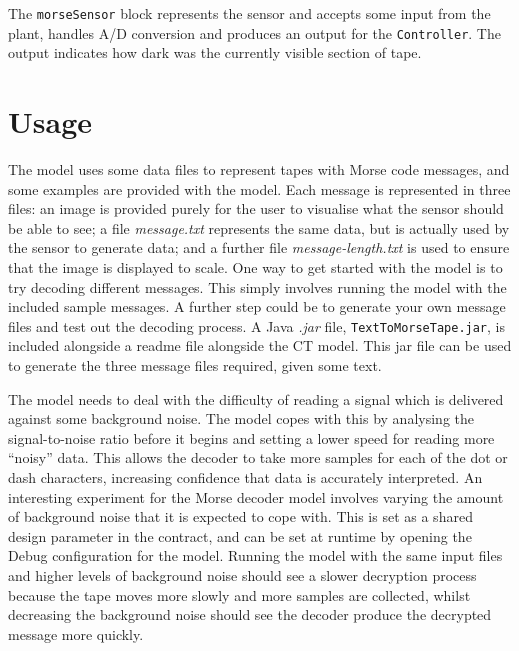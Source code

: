 The \texttt{morseSensor} block represents the sensor and accepts some
input from the plant, handles A/D conversion and produces an output
for the \texttt{Controller}.  The output indicates how dark was the
currently visible section of tape.

\section{Usage} 
The model uses some data files to represent tapes with Morse code
messages, and some examples are provided with the model.  Each message
is represented in three files: an image is provided purely for the
user to visualise what the sensor should be able to see; a file
\emph{message.txt} represents the same data, but is actually used by
the sensor to generate data; and a further file
\emph{message-length.txt} is used to ensure that the image is
displayed to scale.  One way to get started with the model is to try
decoding different messages.  This simply involves running the model
with the included sample messages.  A further step could be to
generate your own message files and test out the decoding process. A
Java \emph{.jar} file, \texttt{TextToMorseTape.jar}, is included
alongside a readme file alongside the CT model.  This jar file can be
used to generate the three message files required, given some text.

The model needs to deal with the difficulty of reading a signal which
is delivered against some background noise.  The model copes with this
by analysing the signal-to-noise ratio before it begins and setting a
lower speed for reading more ``noisy'' data.  This allows the decoder
to take more samples for each of the dot or dash characters,
increasing confidence that data is accurately interpreted.  An
interesting experiment for the Morse decoder model involves varying
the amount of background noise that it is expected to cope with.  This
is set as a shared design parameter in the contract, and can be set at
runtime by opening the Debug configuration for the \DESTECS model.
Running the model with the same input files and higher levels of
background noise should see a slower decryption process because the
tape moves more slowly and more samples are collected, whilst
decreasing the background noise should see the decoder produce the
decrypted message more quickly.
